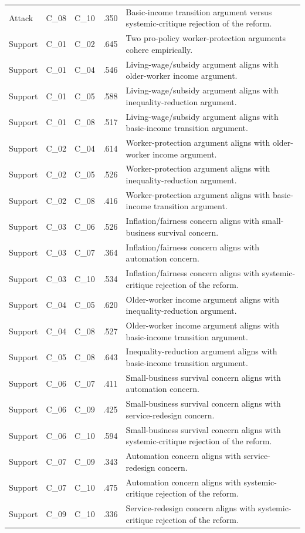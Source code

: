 \begin{longtable}{p{0.54in}p{0.45in}p{0.45in}p{0.36in}p{4.20in}}
Attack & C\_08 & C\_10 & .350 & Basic-income transition argument versus systemic-critique rejection of the reform. \\
Support & C\_01 & C\_02 & .645 & Two pro-policy worker-protection arguments cohere empirically. \\
Support & C\_01 & C\_04 & .546 & Living-wage/subsidy argument aligns with older-worker income argument. \\
Support & C\_01 & C\_05 & .588 & Living-wage/subsidy argument aligns with inequality-reduction argument. \\
Support & C\_01 & C\_08 & .517 & Living-wage/subsidy argument aligns with basic-income transition argument. \\
Support & C\_02 & C\_04 & .614 & Worker-protection argument aligns with older-worker income argument. \\
Support & C\_02 & C\_05 & .526 & Worker-protection argument aligns with inequality-reduction argument. \\
Support & C\_02 & C\_08 & .416 & Worker-protection argument aligns with basic-income transition argument. \\
Support & C\_03 & C\_06 & .526 & Inflation/fairness concern aligns with small-business survival concern. \\
Support & C\_03 & C\_07 & .364 & Inflation/fairness concern aligns with automation concern. \\
Support & C\_03 & C\_10 & .534 & Inflation/fairness concern aligns with systemic-critique rejection of the reform. \\
Support & C\_04 & C\_05 & .620 & Older-worker income argument aligns with inequality-reduction argument. \\
Support & C\_04 & C\_08 & .527 & Older-worker income argument aligns with basic-income transition argument. \\
Support & C\_05 & C\_08 & .643 & Inequality-reduction argument aligns with basic-income transition argument. \\
Support & C\_06 & C\_07 & .411 & Small-business survival concern aligns with automation concern. \\
Support & C\_06 & C\_09 & .425 & Small-business survival concern aligns with service-redesign concern. \\
Support & C\_06 & C\_10 & .594 & Small-business survival concern aligns with systemic-critique rejection of the reform. \\
Support & C\_07 & C\_09 & .343 & Automation concern aligns with service-redesign concern. \\
Support & C\_07 & C\_10 & .475 & Automation concern aligns with systemic-critique rejection of the reform. \\
Support & C\_09 & C\_10 & .336 & Service-redesign concern aligns with systemic-critique rejection of the reform. \\
\end{longtable}
\endgroup

